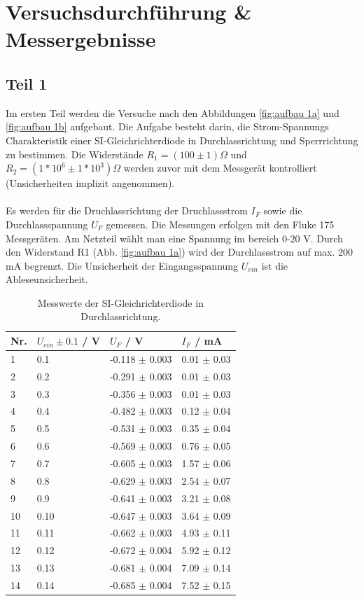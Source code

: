 \documentclass[12pt,a4paper,twoside]{article}
\begin{document}
\section{Versuchsdurchführung \& Messergebnisse} %

\subsection{Teil 1}
Im ersten Teil werden die Versuche nach den Abbildungen \ref{fig:aufbau 1a} und \ref{fig:aufbau 1b} aufgebaut. 
Die Aufgabe besteht darin, die Strom-Spannungs Charakteristik einer SI-Gleichrichterdiode in Durchlassrichtung und Sperrrichtung zu bestimmen. 
Die Widerstände $R_1 = (100 \pm 1) \Omega$ und $R_2 = (1*10^6 \pm 1*10^3) \Omega$ werden zuvor mit dem Messgerät kontrolliert (Unsicherheiten implizit angenommen). 
\\
\\
Es werden für die Druchlassrichtung der Druchlassstrom $I_F$ sowie die Durchlassspannung $U_F$ gemessen. Die Messungen erfolgen mit den Fluke 175 Messgeräten. 
Am Netzteil wählt man eine Spannung im bereich 0-20 V. Durch den Widerstand R1 (Abb. \ref{fig:aufbau 1a}) wird der Durchlassstrom auf max. 200 mA begrenzt. 
Die Unsicherheit der Eingangsspannung $U_{ein}$ ist die Ableseunsicherheit. 

\begin{table}[H]
    \centering
    \caption{Messwerte der SI-Gleichrichterdiode in Durchlassrichtung. }
    \label{tab:mess1a}
    \begin{tabular}{| l | l | l | l |}
        \hline
        Nr. & $U_{ein} \pm 0.1$ / V & $U_F$ / V & $I_F$ / mA \\
        \hline
        1  & 0.1  & -0.118 $\pm$ 0.003 & 0.01 $\pm$ 0.03 \\
        2  & 0.2  & -0.291 $\pm$ 0.003 & 0.01 $\pm$ 0.03 \\
        3  & 0.3  & -0.356 $\pm$ 0.003 & 0.01 $\pm$ 0.03 \\
        4  & 0.4  & -0.482 $\pm$ 0.003 & 0.12 $\pm$ 0.04 \\
        5  & 0.5  & -0.531 $\pm$ 0.003 & 0.35 $\pm$ 0.04 \\
        6  & 0.6  & -0.569 $\pm$ 0.003 & 0.76 $\pm$ 0.05 \\
        7  & 0.7  & -0.605 $\pm$ 0.003 & 1.57 $\pm$ 0.06 \\
        8  & 0.8  & -0.629 $\pm$ 0.003 & 2.54 $\pm$ 0.07 \\
        9  & 0.9  & -0.641 $\pm$ 0.003 & 3.21 $\pm$ 0.08 \\
        10 & 0.10 & -0.647 $\pm$ 0.003 & 3.64 $\pm$ 0.09 \\
        11 & 0.11 & -0.662 $\pm$ 0.003 & 4.93 $\pm$ 0.11 \\
        12 & 0.12 & -0.672 $\pm$ 0.004 & 5.92 $\pm$ 0.12 \\
        13 & 0.13 & -0.681 $\pm$ 0.004 & 7.09 $\pm$ 0.14 \\
        14 & 0.14 & -0.685 $\pm$ 0.004 & 7.52 $\pm$ 0.15 \\
        \hline
    \end{tabular}
\end{table}
\end{document}
